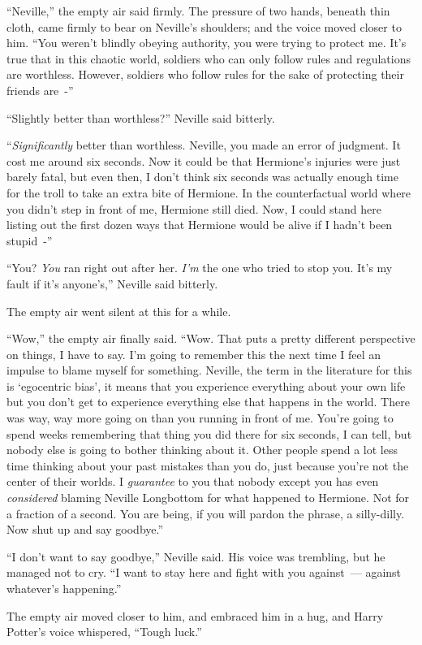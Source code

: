``Neville,'' the empty air said firmly. The pressure of two hands, beneath thin cloth, came firmly to bear on Neville's shoulders; and the voice moved closer to him. ``You weren't blindly obeying authority, you were trying to protect me. It's true that in this chaotic world, soldiers who can only follow rules and regulations are worthless. However, soldiers who follow rules for the sake of protecting their friends are~-''

``Slightly better than worthless?'' Neville said bitterly.

``\emph{Significantly} better than worthless. Neville, you made an error of judgment. It cost me around six seconds. Now it could be that Hermione's injuries were just barely fatal, but even then, I don't think six seconds was actually enough time for the troll to take an extra bite of Hermione. In the counterfactual world where you didn't step in front of me, Hermione still died. Now, I could stand here listing out the first dozen ways that Hermione would be alive if I hadn't been stupid~-''

``You? \emph{You} ran right out after her. \emph{I'm} the one who tried to stop you. It's my fault if it's anyone's,'' Neville said bitterly.

The empty air went silent at this for a while.

``Wow,'' the empty air finally said. ``Wow. That puts a pretty different perspective on things, I have to say. I'm going to remember this the next time I feel an impulse to blame myself for something. Neville, the term in the literature for this is `egocentric bias', it means that you experience everything about your own life but you don't get to experience everything else that happens in the world. There was way, way more going on than you running in front of me. You're going to spend weeks remembering that thing you did there for six seconds, I can tell, but nobody else is going to bother thinking about it. Other people spend a lot less time thinking about your past mistakes than you do, just because you're not the center of their worlds. I \emph{guarantee} to you that nobody except you has even \emph{considered} blaming Neville Longbottom for what happened to Hermione. Not for a fraction of a second. You are being, if you will pardon the phrase, a silly-dilly. Now shut up and say goodbye.''

``I don't want to say goodbye,'' Neville said. His voice was trembling, but he managed not to cry. ``I want to stay here and fight with you against~--- against whatever's happening.''

The empty air moved closer to him, and embraced him in a hug, and Harry Potter's voice whispered, ``Tough luck.''
